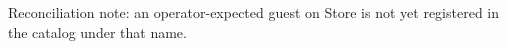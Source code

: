 \textcolor{accent}{Reconciliation note:} an operator-expected guest on Store is
not yet registered in the catalog under that name.
